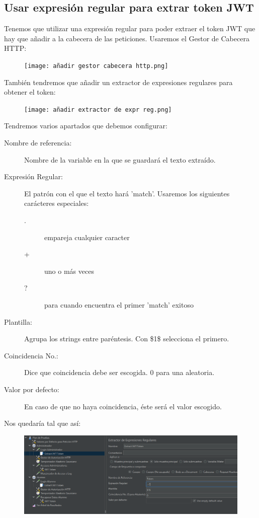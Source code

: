 \documentclass[a4paper]{article}
\begin{document}
\subsection{Usar expresión regular para extrar token JWT}
Tenemos que utilizar una expresión regular para poder extraer el token JWT que hay 
que añadir a la cabecera de las peticiones. Usaremos el Gestor de Cabecera HTTP:
\begin{figure}[hbt!]
    \centering
    \texttt{[image: añadir gestor cabecera http.png]}
\end{figure}
\newpage
También tendremos que añadir un extractor de expresiones regulares para obtener el token:
\begin{figure}[hbt!]
    \centering
    \texttt{[image: añadir extractor de expr reg.png]}
\end{figure}
\newline Tendremos varios apartados que debemos configurar:
\begin{description}
    \item[Nombre de referencia:] Nombre de la variable en la que se guardará el
    texto extraído. 
    \item[Expresión Regular:] El patrón con el que el texto hará 'match'. Usaremos los siguientes carácteres especiales:
    \begin{description}
        \item[.]  empareja cualquier caracter
        \item[+]  uno o más veces 
        \item[?]  para cuando encuentra el primer 'match' exitoso
    \end{description} 
    \item[Plantilla:] Agrupa los strings entre paréntesis. Con \$1\$ selecciona el primero.
    \item[Coincidencia No.:] Dice que coincidencia debe ser escogida. 0 para una aleatoria.
    \item[Valor por defecto:] En caso de que no haya coincidencia, éste será el valor escogido.  
\end{description}
Nos quedaría tal que así:
\begin{figure}[hbt!]
    \centering
    \includegraphics[width=\textwidth]{expresion regular config.png}
\end{figure}
\end{document}
